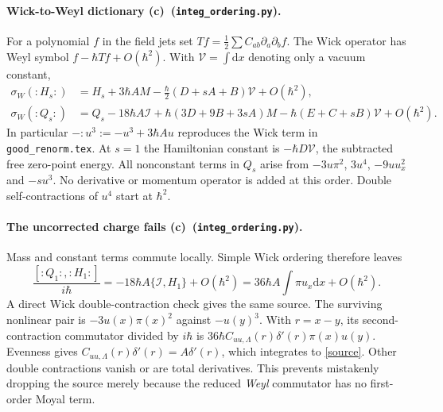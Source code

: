 \documentclass[11pt,a4paper]{article}
\newcommand{\C}{\textbf{(c)}\ }
\newcommand{\dd}{\mathrm d}
\newcommand{\file}[1]{\nolinkurl{#1}}
\newcommand{\ord}{\file{integ_ordering.py}}
\newcommand{\I}{\mathcal I}
\newcommand{\vol}{\mathcal V}
\begin{document}
\paragraph{Wick-to-Weyl dictionary \C (\ord).}
For a polynomial $f$ in the field jets set
$Tf=\tfrac12\sum C_{ab}\partial_a\partial_bf$.
The Wick operator has Weyl symbol $f-\hbar Tf+O(\hbar^2)$.
With $\vol=\int\dd x$ denoting only a vacuum constant,
\begin{align}
 \sigma_W(:H_s:)&=H_s+3\hbar AM
       -\tfrac\hbar2(D+sA+B)\vol+O(\hbar^2),\\
 \sigma_W(:Q_s:)&=Q_s-18\hbar A\I
       +\hbar(3D+9B+3sA)M
       -\hbar(E+C+sB)\vol+O(\hbar^2).\label{wick}
\end{align}
In particular $-:u^3:=-u^3+3\hbar Au$ reproduces the Wick term in
\file{good_renorm.tex}. At $s=1$ the Hamiltonian constant is
$-\hbar D\vol$, the subtracted free zero-point energy.
All nonconstant terms in $Q_s$ arise from $-3u\pi^2$, $3u^4$,
$-9uu_x^2$ and $-su^3$. No derivative or momentum operator is added at
this order. Double self-contractions of $u^4$ start at $\hbar^2$.

\paragraph{The uncorrected charge fails \C (\ord).}
Mass and constant terms commute locally. Simple Wick ordering therefore
leaves
\begin{equation}
 \frac{[:Q_1:,:H_1:]}{i\hbar}
 =-18\hbar A\{\I,H_1\}+O(\hbar^2)
 =36\hbar A\int\pi u_x\dd x+O(\hbar^2).\label{source}
\end{equation}
A direct Wick double-contraction check gives the same source. The surviving
nonlinear pair is $-3u(x)\pi(x)^2$ against $-u(y)^3$. With $r=x-y$,
its second-contraction commutator divided by $i\hbar$ is
$36\hbar C_{uu,\Lambda}(r)\delta'(r)\pi(x)u(y)$.
Evenness gives $C_{uu,\Lambda}(r)\delta'(r)=A\delta'(r)$, which integrates
to \eqref{source}. Other double contractions vanish or are total
derivatives. This prevents mistakenly dropping the source merely because
the reduced \emph{Weyl} commutator has no first-order Moyal term.
\end{document}
